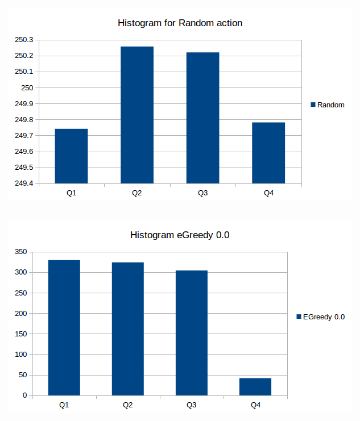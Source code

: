 \documentclass[a4paper, 11pt]{article}
\begin{document}
\begin{figure}[H]
\centering
\begin{subfigure}{.5\textwidth}
  \centering
  \includegraphics[width=1\linewidth]{ex1_histogram_random}
\end{subfigure}%
\begin{subfigure}{.5\textwidth}
  \centering
  \includegraphics[width=1\linewidth]{ex1_histogram_egreedy00}
\end{subfigure}%


\end{figure}
\end{document}
